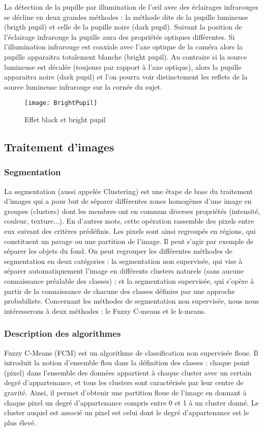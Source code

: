 La détection de la pupille par illumination de l’œil avec des éclairages infrarouges se décline en deux grandes méthodes : la méthode dite de la pupille lumineuse (brigth pupil) et celle de la pupille noire (dark pupil). Suivant la position de l’éclairage infrarouge la pupille aura des propriétés optiques différentes. Si l’illumination infrarouge est coaxiale avec l’axe optique de la caméra alors la pupille apparaitra totalement blanche (bright pupil). Au contraire si la source lumineuse est décalée (toujours par rapport à l’axe optique), alors la pupille apparaitra noire (dark pupil) et l’on pourra voir distinctement les reflets de la source lumineuse infrarouge sur la cornée du sujet.

\begin{figure}[H]
  \centering
  \texttt{[image: BrightPupil]}
  \caption{Effet black et bright pupil}
  \label{fig:BrightPupil}
\end{figure}

\subsection{Traitement d’images}

\subsubsection{Segmentation}

La segmentation (aussi appelée Clustering) \cite{d2004etude} est une étape de base du traitement d’images qui a pour but de séparer différentes zones homogènes d’une image en groupes (clusters) dont les membres ont en commun diverses propriétés (intensité, couleur, texture...). En d’autres mots, cette opération rassemble des pixels entre eux suivant des critères prédéfinis. Les pixels sont ainsi regroupés en régions, qui constituent un pavage ou une partition de l'image. Il peut s'agir par exemple de séparer les objets du fond. On peut regrouper les différentes méthodes de segmentation en deux catégories : la segmentation non supervisée, qui vise à séparer automatiquement l’image en différents clusters naturels (sans aucune connaissance préalable des classes) ; et la segmentation supervisée, qui s’opère à partir de la connaissance de chacune des classes définies par une approche probabiliste. Concernant les méthodes de segmentation non supervisée, nous nous intéresserons à deux méthodes : le Fuzzy C-means et le k-means. 

\subsubsection*{Description des algorithmes}
Fuzzy C-Means (FCM) est un algorithme de classification non supervisée floue. Il introduit la notion d’ensemble flou dans la définition des classes : chaque point (pixel) dans l’ensemble des données appartient à chaque cluster avec un certain degré d’appartenance, et tous les clusters sont caractérisés par leur centre de gravité. Ainsi, il permet d’obtenir une partition floue de l’image en donnant à chaque pixel un degré d’appartenance compris entre 0 et 1 à un cluster donné. Le cluster auquel est associé un pixel est celui dont le degré d’appartenance est le plus élevé.

